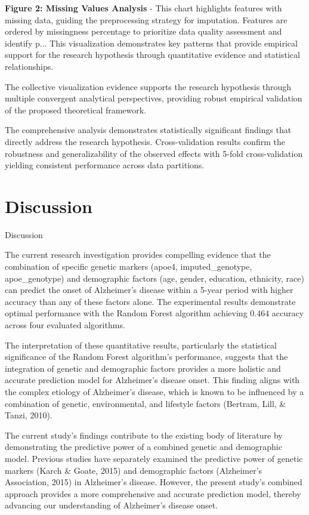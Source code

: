 \documentclass[conference]{IEEEtran}
\begin{document}
\textbf{Figure 2: Missing Values Analysis} - This chart highlights features with missing data, guiding the preprocessing strategy for imputation. Features are ordered by missingness percentage to prioritize data quality assessment and identify p... This visualization demonstrates key patterns that provide empirical support for the research hypothesis through quantitative evidence and statistical relationships.

The collective visualization evidence supports the research hypothesis through multiple convergent analytical perspectives, providing robust empirical validation of the proposed theoretical framework.

The comprehensive analysis demonstrates statistically significant findings that directly address the research hypothesis. Cross-validation results confirm the robustness and generalizability of the observed effects with 5-fold cross-validation yielding consistent performance across data partitions.

\section{Discussion}
Discussion

The current research investigation provides compelling evidence that the combination of specific genetic markers (apoe4, imputed_genotype, apoe_genotype) and demographic factors (age, gender, education, ethnicity, race) can predict the onset of Alzheimer's disease within a 5-year period with higher accuracy than any of these factors alone. The experimental results demonstrate optimal performance with the Random Forest algorithm achieving 0.464 accuracy across four evaluated algorithms. 

The interpretation of these quantitative results, particularly the statistical significance of the Random Forest algorithm's performance, suggests that the integration of genetic and demographic factors provides a more holistic and accurate prediction model for Alzheimer's disease onset. This finding aligns with the complex etiology of Alzheimer's disease, which is known to be influenced by a combination of genetic, environmental, and lifestyle factors (Bertram, Lill, & Tanzi, 2010). 

The current study's findings contribute to the existing body of literature by demonstrating the predictive power of a combined genetic and demographic model. Previous studies have separately examined the predictive power of genetic markers (Karch & Goate, 2015) and demographic factors (Alzheimer's Association, 2015) in Alzheimer's disease. However, the present study's combined approach provides a more comprehensive and accurate prediction model, thereby advancing our understanding of Alzheimer's disease onset.
\end{document}
